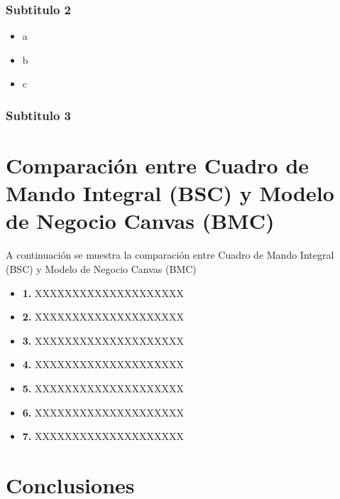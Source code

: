 \documentclass[preprint,12pt]{elsarticle}
\begin{document}
	\subsubsection{\textbf{Subtitulo 2}}

	\begin{itemize}
	\item a
	\item b
	\item c
	\end{itemize}

	\subsubsection{\textbf{Subtitulo 3}}







\section{Comparación entre Cuadro de Mando Integral (BSC) y Modelo de Negocio Canvas (BMC)}
A continuación se muestra la comparación entre Cuadro de Mando Integral (BSC) y Modelo de Negocio Canvas (BMC)
	
	\begin{itemize}

	\item{\textbf{1.}} XXXXXXXXXXXXXXXXXXXX
	\item{\textbf{2.}} XXXXXXXXXXXXXXXXXXXX
	\item{\textbf{3.}} XXXXXXXXXXXXXXXXXXXX
	\item{\textbf{4.}} XXXXXXXXXXXXXXXXXXXX
	\item{\textbf{5.}} XXXXXXXXXXXXXXXXXXXX
	\item{\textbf{6.}} XXXXXXXXXXXXXXXXXXXX
	\item{\textbf{7.}} XXXXXXXXXXXXXXXXXXXX
	\end{itemize}


\section{Conclusiones}
\end{document}
